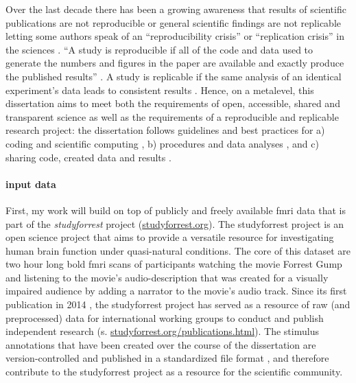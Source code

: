 Over the last decade there has been a growing awareness that results of
scientific publications are not reproducible or general scientific findings are
not replicable letting some authors speak of an ``reproducibility crisis'' or
``replication crisis'' in the sciences \citep{baker2016reproducibility,
plesser2018reproducibility, stupple2019reproducibility, nosek2022replicability}.
``A study is reproducible if all of the code and data used to generate the
numbers and figures in the paper are available and exactly produce the published
results'' \citep{leek2017most}.
A study is replicable if the same analysis of an identical experiment's data
leads to consistent results \citep{dubois2016building, leek2017most}.
%
Hence, on a metalevel, this dissertation aims to meet both the requirements of
open, accessible, shared and transparent science \citep{watson2015will,
fecher2014open} as well as the requirements of a reproducible and replicable
research project:
%
the dissertation follows guidelines and best practices for a) coding and
scientific computing \citep{wilson2014best}, b) procedures and data analyses
\citep{nichols2017best, poldrack2017scanning, poldrack2019establishment}, and c)
sharing code, created data and results \citep{eglen2017toward, nichols2017best,
pernet2015improving}.


\paragraph{input data}

First, my work will build on top of publicly and freely available \ac{fmri} data
that is part of the \textit{studyforrest} project
(\href{www.studyforrest.org}{studyforrest.org}).
%
The studyforrest project is an open science project that aims to provide a
versatile resource for investigating human brain function under quasi-natural
conditions.
%
The core of this dataset are two hour long \ac{bold} \ac{fmri} scans of
participants watching the movie Forrest Gump and listening to the movie's
audio-description that was created for a visually impaired audience by adding a
narrator to the movie's audio track.
%
Since its first publication in 2014 \citep{hanke2014audiomovie}, the
studyforrest project has served as a resource of raw (and preprocessed) data for
international working groups to conduct and publish independent research (s.
\href{www.studyforrest.org/publications.html}{studyforrest.org/publications.html}).
%
The stimulus annotations that have been created over the course of the
dissertation are version-controlled and published in a standardized file format
\citep{haeusler2021speechanno}, and therefore contribute to the studyforrest
project as a resource for the scientific community.


